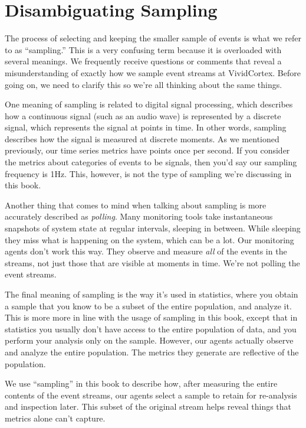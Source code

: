 \documentclass{vivid_layout}
\begin{document}
\section{Disambiguating Sampling}

The process of selecting and keeping the smaller sample of events is what we refer to
as ``sampling.'' This is a very confusing term because it is overloaded with
several meanings. We frequently receive questions or comments that reveal a
misunderstanding of exactly how we sample event streams at VividCortex. Before
going on, we need to clarify this so we're all thinking about the same things.

One meaning of sampling is related to digital signal processing, which describes
how a continuous signal (such as an audio wave) is represented by a discrete
signal, which represents the signal at points in time. In other words, sampling
describes how the signal is measured at discrete moments. As we mentioned
previously, our time series metrics have points once per second. If you consider
the metrics about categories of events to be signals, then you'd say our
sampling frequency is 1Hz.  This, however, is not the type of sampling we're
discussing in this book.

Another thing that comes to mind when talking about sampling is more accurately
described as \emph{polling}. Many monitoring tools take instantaneous snapshots
of system state at regular intervals, sleeping in between. While sleeping they
miss what is happening on the system, which can be a lot.  Our monitoring agents
don't work this way. They observe and measure \emph{all} of the events in the
streams, not just those that are visible at moments in time. We're not polling
the event streams.

The final meaning of sampling is the way it's used in statistics, where you
obtain a sample that you know to be a subset of the entire population, and
analyze it. This is more more in line with the usage of sampling in this book,
except that in statistics you usually don't have access to the entire population
of data, and you perform your analysis only on the sample. However, our agents
actually observe and analyze the entire population. The metrics they generate
are reflective of the population.

We use ``sampling'' in this book to describe how, after measuring the
entire contents of the event streams, our agents select a sample to retain for
re-analysis and inspection later. This subset of the original stream helps
reveal things that metrics alone can't capture.
\end{document}
